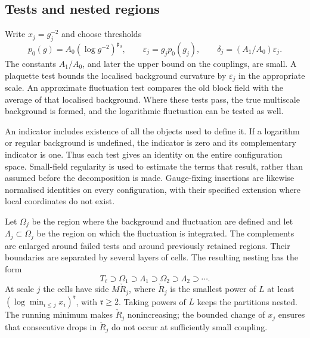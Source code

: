 \documentclass[11pt,letterpaper,reqno]{amsart}
\theoremstyle{definition}
\theoremstyle{remark}
\begin{document}
\subsection{Tests and nested regions}

Write $x_j=g_j^{-2}$ and choose thresholds
\[
 p_0(g)=A_0(\log g^{-2})^{\mathfrak p_0},\qquad
 \varepsilon_j=g_jp_0(g_j),\qquad
 \delta_j=(A_1/A_0)\varepsilon_j.
\]
The constants $A_1/A_0$, and later the upper bound on the couplings,
are small. A plaquette test bounds the localised background curvature
by $\varepsilon_j$ in the appropriate scale. An approximate fluctuation
test compares the old block field with the average of that localised
background. Where these tests pass, the true multiscale background is
formed, and the logarithmic fluctuation can be tested as well.

An indicator includes existence of all the objects used to define it.
If a logarithm or regular background is undefined, the indicator is
zero and its complementary indicator is one. Thus each test gives an
identity on the entire configuration space. Small-field regularity is
used to estimate the terms that result, rather than assumed before
the decomposition is made. Gauge-fixing insertions are likewise
normalised identities on every configuration, with their specified
extension where local coordinates do not exist.

Let $\Omega_j$ be the region where the background and fluctuation are
defined and let $\Lambda_j\subset\Omega_j$ be the region on which
the fluctuation is integrated. The complements are enlarged around
failed tests and around previously retained regions. Their boundaries
are separated by several layers of cells. The resulting nesting has
the form
\[
 T_\ell\supset\Omega_1\supset\Lambda_1
 \supset\Omega_2\supset\Lambda_2\supset\cdots.
\]
At scale $j$ the cells have side $M\check R_j$, where
$\check R_j$ is the smallest power of $L$ at least
$(\log\min_{i\le j}x_i)^{\mathfrak r}$, with $\mathfrak r\ge2$.
Taking powers of $L$ keeps the partitions nested. The running minimum
makes $\check R_j$ nonincreasing; the bounded change of $x_j$ ensures
that consecutive drops in $\check R_j$ do not occur at sufficiently
small coupling.
\end{document}
